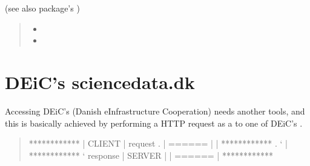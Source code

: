\documentclass[a4paper,12pt,english]{sphinxhowto}
\begin{document}

(see also package’s  )

\begin{quote}



\begin{itemize}
\item {} 

\item {} 

\end{itemize}


\end{quote}



\section{DEiC’s sciencedata.dk}
\label{\detokenize{Sciencedata_dk:deic-s-sciencedata-dk}}\label{\detokenize{Sciencedata_dk:deic-sddk}}\label{\detokenize{Sciencedata_dk::doc}}
Accessing DEiC’s (Danish e\sphinxhyphen{}Infrastructure Cooperation) 
needs another tools, and this is basically achieved by performing a HTTP request as a 
to one of DEiC’s .
\begin{quote}

\begin{sphinxVerbatim}[commandchars=\\\{\},formatcom=\footnotesize]
************
|  CLIENT  | \PYGZhy{}\PYGZhy{}\PYGZgt{}\PYGZhy{}\PYGZhy{}\PYGZgt{}  request  \PYGZhy{}\PYGZgt{}\PYGZhy{}\PYGZhy{}\PYGZgt{}\PYGZhy{}\PYGZhy{}\PYGZgt{}\PYGZhy{}\PYGZhy{}\PYGZgt{}\PYGZhy{}\PYGZhy{}\PYGZgt{}.
|  ======  |                                |
************                                .
     `                                      |
     \PYGZca{}                                 ************
     `\PYGZlt{}\PYGZhy{}\PYGZhy{}\PYGZlt{}\PYGZhy{}\PYGZhy{}\PYGZlt{}\PYGZhy{}\PYGZhy{}\PYGZlt{}\PYGZhy{}\PYGZhy{}\PYGZlt{}  response  \PYGZlt{}\PYGZhy{}\PYGZhy{} \PYGZlt{}\PYGZhy{}\PYGZhy{} |  SERVER  |
                                       |  ======  |
                                       ************
\end{sphinxVerbatim}
\end{quote}
\end{document}
